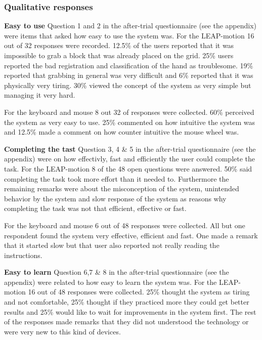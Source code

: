 \subsubsection{Qualitative responses}
\textbf{Easy to use}\newline
Question 1 and 2 in the after-trial questionnaire (see the appendix) were items that asked how easy to use the system was. For the LEAP-motion 16 out of 32 responses were recorded. 12.5\% of the users reported that it was impossible to grab a block that was already placed on the grid. 25\% users reported the bad registration and classification of the hand as troublesome. 19\% reported that grabbing in general was very difficult and 6\% reported that it was physically very tiring. 30\% viewed the concept of the system as very simple but managing it very hard.

For the keyboard and mouse 8 out 32 of responses were collected. 60\% perceived the system as very easy to use. 25\% commented on how intuitive the system was and 12.5\% made a comment on how counter intuitive the mouse wheel was. \newline

\noindent\textbf{Completing the tast}\newline
Question 3, 4 \& 5 in the after-trial questionnaire (see the appendix) were on how effectivly, fast and efficiently the user could complete the task. For the LEAP-motion 8 of the 48 open questions were answered. 50\% said completing the task took more effort than it needed to. Furthermore the remaining remarks were about the misconception of the system, unintended behavior by the system and slow response of the system as reasons why completing the task was not that efficient, effective or fast.

For the keyboard and mouse 6 out of 48 responses were collected. All but one respondent found the system very effective, efficient and fast. One made a remark that it started slow but that user also reported not really reading the instructions. \newline

\noindent\textbf{Easy to learn}\newline
Question 6,7 \& 8 in the after-trial questionnaire (see the appendix) were related to how easy to learn the system was. For the LEAP-motion 16 out of 48 responses were collected. 25\% thought the system as tiring and not comfortable, 25\% thought if they practiced more they could get better results and 25\% would like to wait for improvements in the system first. The rest of the responses made remarks that they did not understood the technology or were very new to this kind of devices.  

